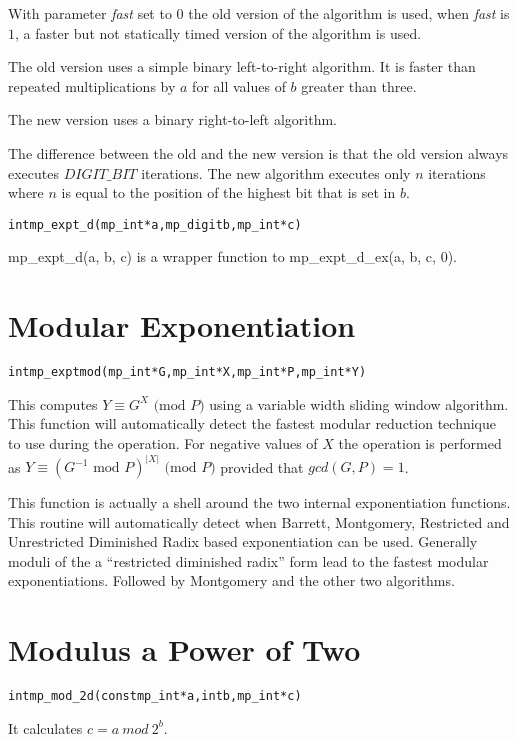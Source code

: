 \documentclass[synpaper]{book}
\def\mod{{\mathit\ mod\ }}
\begin{document}
With parameter \textit{fast} set to $0$ the old version of the algorithm is used,
when \textit{fast} is $1$, a faster but not statically timed version of the algorithm is used.

The old version uses a simple binary left-to-right algorithm.
It is faster than repeated multiplications by $a$ for all values of $b$ greater than three.

The new version uses a binary right-to-left algorithm.

The difference between the old and the new version is that the old version always
executes $DIGIT\_BIT$ iterations. The new algorithm executes only $n$ iterations
where $n$ is equal to the position of the highest bit that is set in $b$.

\begin{alltt}
int mp_expt_d (mp_int * a, mp_digit b, mp_int * c)
\end{alltt}
mp\_expt\_d(a, b, c) is a wrapper function to mp\_expt\_d\_ex(a, b, c, 0).

\section{Modular Exponentiation}
\begin{alltt}
int mp_exptmod (mp_int * G, mp_int * X, mp_int * P, mp_int * Y)
\end{alltt}
This computes $Y \equiv G^X \mbox{ (mod }P\mbox{)}$ using a variable width sliding window algorithm.  This function
will automatically detect the fastest modular reduction technique to use during the operation.  For negative values of
$X$ the operation is performed as $Y \equiv (G^{-1} \mbox{ mod }P)^{\vert X \vert} \mbox{ (mod }P\mbox{)}$ provided that
$gcd(G, P) = 1$.

This function is actually a shell around the two internal exponentiation functions.  This routine will automatically
detect when Barrett, Montgomery, Restricted and Unrestricted Diminished Radix based exponentiation can be used.  Generally
moduli of the a ``restricted diminished radix'' form lead to the fastest modular exponentiations.  Followed by Montgomery
and the other two algorithms.

\section{Modulus a Power of Two}
\begin{alltt}
int mp_mod_2d(const mp_int *a, int b, mp_int *c)
\end{alltt}
It calculates $c = a \mod 2^b$.
\end{document}
